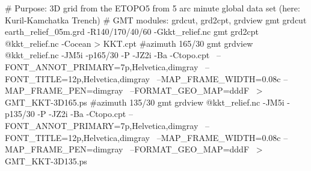 # Purpose: 3D grid from the ETOPO5 from 5 arc minute global data set (here: Kuril-Kamchatka Trench)
# GMT modules: grdcut, grd2cpt, grdview
gmt grdcut earth_relief_05m.grd -R140/170/40/60 -Gkkt_relief.nc
gmt grd2cpt @kkt_relief.nc -Cocean > KKT.cpt
#azimuth 165/30
gmt grdview @kkt_relief.nc -JM5i -p165/30 -P -JZ2i  -Ba -Ctopo.cpt \
	--FONT_ANNOT_PRIMARY=7p,Helvetica,dimgray \
	--FONT_TITLE=12p,Helvetica,dimgray \
	--MAP_FRAME_WIDTH=0.08c --MAP_FRAME_PEN=dimgray \
	--FORMAT_GEO_MAP=dddF  \
	 > GMT_KKT-3D165.ps
#azimuth 135/30
gmt grdview @kkt_relief.nc -JM5i -p135/30 -P -JZ2i  -Ba -Ctopo.cpt --FONT_ANNOT_PRIMARY=7p,Helvetica,dimgray \
	--FONT_TITLE=12p,Helvetica,dimgray \
	--MAP_FRAME_WIDTH=0.08c --MAP_FRAME_PEN=dimgray \
	--FORMAT_GEO_MAP=dddF \
	 > GMT_KKT-3D135.ps